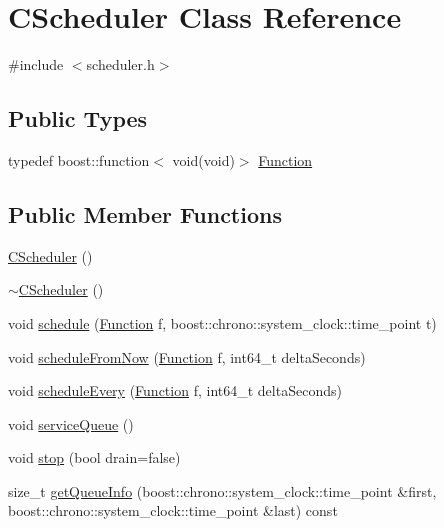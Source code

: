 \hypertarget{class_c_scheduler}{}\section{C\+Scheduler Class Reference}
\label{class_c_scheduler}


{\ttfamily \#include $<$scheduler.\+h$>$}

\subsection*{Public Types}
\begin{DoxyCompactItemize}
\item 
typedef boost\+::function$<$ void(void)$>$ \mbox{\hyperlink{class_c_scheduler_af0202f526eeef71defb156dc06f70279}{Function}}
\end{DoxyCompactItemize}
\subsection*{Public Member Functions}
\begin{DoxyCompactItemize}
\item 
\mbox{\hyperlink{class_c_scheduler_a388ba8ffa4dfc6ed0a4ac63ddeb2a51a}{C\+Scheduler}} ()
\item 
\mbox{\hyperlink{class_c_scheduler_ab453c8d28d84cf31ee3d5f621f4f45ed}{$\sim$\+C\+Scheduler}} ()
\item 
void \mbox{\hyperlink{class_c_scheduler_a14747dc42599cc0a17f45f1767932d6e}{schedule}} (\mbox{\hyperlink{class_c_scheduler_af0202f526eeef71defb156dc06f70279}{Function}} f, boost\+::chrono\+::system\+\_\+clock\+::time\+\_\+point t)
\item 
void \mbox{\hyperlink{class_c_scheduler_ad5faa192176dc51e3c68356589934b7a}{schedule\+From\+Now}} (\mbox{\hyperlink{class_c_scheduler_af0202f526eeef71defb156dc06f70279}{Function}} f, int64\+\_\+t delta\+Seconds)
\item 
void \mbox{\hyperlink{class_c_scheduler_ad7fcff70877bf1d84f30c1137bba816f}{schedule\+Every}} (\mbox{\hyperlink{class_c_scheduler_af0202f526eeef71defb156dc06f70279}{Function}} f, int64\+\_\+t delta\+Seconds)
\item 
void \mbox{\hyperlink{class_c_scheduler_a14d2800815da93577858ea078aed1fba}{service\+Queue}} ()
\item 
void \mbox{\hyperlink{class_c_scheduler_a328f18f2d0eb9977180c8b091a17947a}{stop}} (bool drain=false)
\item 
size\+\_\+t \mbox{\hyperlink{class_c_scheduler_a6cdbfd095e9f7695c09769d4c1b05461}{get\+Queue\+Info}} (boost\+::chrono\+::system\+\_\+clock\+::time\+\_\+point \&first, boost\+::chrono\+::system\+\_\+clock\+::time\+\_\+point \&last) const
\end{DoxyCompactItemize}
